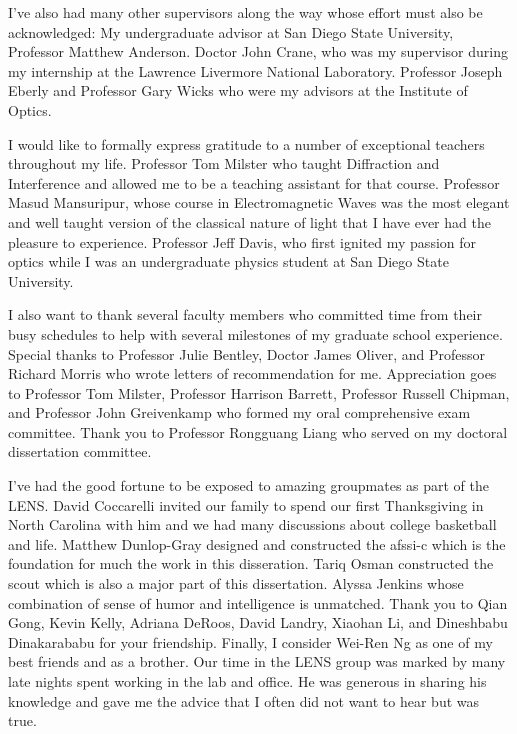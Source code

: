 I've also had many other supervisors along the way whose effort must also be acknowledged: My undergraduate advisor at San Diego State University, Professor Matthew Anderson. Doctor John Crane, who was my supervisor during my internship at the Lawrence Livermore National Laboratory. Professor Joseph Eberly and Professor Gary Wicks who were my advisors at the Institute of Optics. 

I would like to formally express gratitude to a number of exceptional teachers throughout my life. Professor Tom Milster who taught Diffraction and Interference and allowed me to be a teaching assistant for that course. Professor Masud Mansuripur, whose course in Electromagnetic Waves was the most elegant and well taught version of the classical nature of light that I have ever had the pleasure to experience. Professor Jeff Davis, who first ignited my passion for optics while I was an undergraduate physics student at San Diego State University.

I also want to thank several faculty members who committed time from their busy schedules to help with several milestones of my graduate school experience. Special thanks to Professor Julie Bentley, Doctor James Oliver, and Professor Richard Morris who wrote letters of recommendation for me. Appreciation goes to Professor Tom Milster, Professor Harrison Barrett, Professor Russell Chipman, and Professor John Greivenkamp who formed my oral comprehensive exam committee. Thank you to Professor Rongguang Liang who served on my doctoral dissertation committee.

I've had the good fortune to be exposed to amazing groupmates as part of the \gls{LENS}. David Coccarelli invited our family to spend our first Thanksgiving in North Carolina with him and we had many discussions about college basketball and life. Matthew Dunlop-Gray designed and constructed the \gls{afssi-c} which is the foundation for much the work in this disseration. Tariq Osman constructed the \gls{scout} which is also a major part of this dissertation. Alyssa Jenkins whose combination of sense of humor and intelligence is unmatched. Thank you to Qian Gong, Kevin Kelly, Adriana DeRoos, David Landry, Xiaohan Li, and Dineshbabu Dinakarababu for your friendship. Finally, I consider Wei-Ren Ng as one of my best friends and as a brother. Our time in the \gls{LENS} group was marked by many late nights spent working in the lab and office. He was generous in sharing his knowledge and gave me the advice that I often did not want to hear but was true. 

